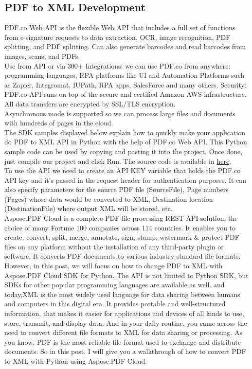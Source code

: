 \documentclass[
10pt, %
a4paper, %
oneside, %
headinclude,footinclude, %
BCOR5mm, %
]{scrartcl}
\begin{document}
\subsection{PDF to XML Development}
PDF.co Web API is the flexible Web API that includes a full set of functions from e-signature requests to data extraction, OCR, image recognition, PDF splitting, and PDF splitting. Can also generate barcodes and read barcodes from images, scans, and PDFs.\\
Use from API or via 300+ Integrations: we can use PDF.co from anywhere: programming languages, RPA platforms like UI and Automation Platforms such as Zapier, Integromat, IUPath, RPA apps, SalesForce and many others.
Security: PDF.co API runs on top of the secure and certified Amazon AWS infrastructure. All data transfers are encrypted by SSL/TLS encryption.\\
Asynchronous mode is supported so we can process large files and documents with hundreds of pages in the cloud.\\
The SDK samples displayed below explain how to quickly make your application do PDF to XML API in Python with the help of PDF.co Web API. This Python sample code can be used by copying and pasting it into the project. Once done, just compile our project and click Run. The source code is available in \href{https://github.com/bytescout/pdf-co-api-samples}{here}.\\
To use the API we need to create an API KEY variable that holds the PDF.co API key and it’s passed in the request header for authentication purposes. It can also specify parameters for the source PDF file (SourceFile), Page numbers (Pages) whose data would be converted to XML, Destination location (DestinationFile) where output XML will be stored, etc.\\
Aspose.PDF Cloud is a complete PDF file processing REST API solution, the choice of many Fortune 100 companies across 114 countries. It enables you to create, convert, split, merge, annotate, sign, stamp, watermark \& protect PDF files on any platform without the installation of any third-party plugin or software. It converts PDF documents to various industry-standard file formats. However,
in this post, we will focus on how to change PDF to XML with Aspose.PDF Cloud SDK for Python. The API is not limited to Python SDK, but SDKs for other popular programming languages are available as well.
and today,XML is the most widely used language for data sharing between humans and computers in this digital era. It provides portable and well-structured information, that makes it easier for applications and devices of all kinds to use, store, transmit, and display data. And in your daily routine, you came across the need to convert different file formats to XML for data sharing or processing.
As you know, PDF is the most reliable file format used to exchange and distribute documents. So in this post, I will give you a walkthrough of how to convert PDF to XML with Python using Aspose.PDF Cloud.
\end{document}
